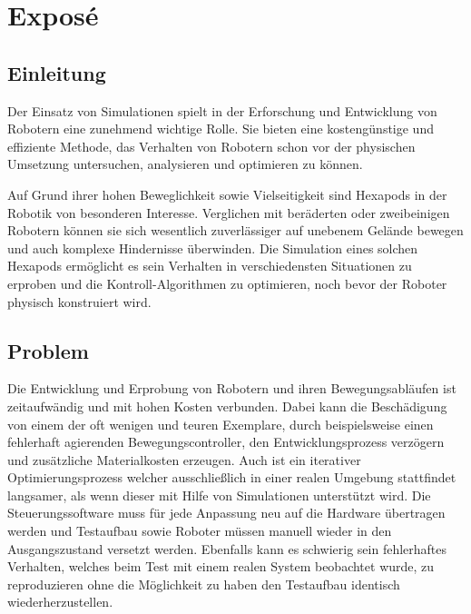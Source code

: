 \chapter{Exposé}
\label{ch:expose}



\section{Einleitung}
Der Einsatz von Simulationen spielt in der Erforschung und Entwicklung von Robotern eine zunehmend wichtige Rolle. 
Sie bieten eine kostengünstige und effiziente Methode, das Verhalten von Robotern schon vor der physischen Umsetzung untersuchen, analysieren und optimieren zu können. 

Auf Grund ihrer hohen Beweglichkeit sowie Vielseitigkeit sind Hexapods in der Robotik von besonderen Interesse. 
Verglichen mit beräderten oder zweibeinigen Robotern können sie sich wesentlich zuverlässiger auf unebenem Gelände bewegen und auch komplexe Hindernisse überwinden.
Die Simulation eines solchen Hexapods ermöglicht es sein Verhalten in verschiedensten Situationen zu erproben und die Kontroll-Algorithmen zu optimieren, noch bevor der Roboter physisch konstruiert wird.

\section{Problem}

Die Entwicklung und Erprobung von Robotern und ihren Bewegungsabläufen ist zeitaufwändig und mit hohen Kosten verbunden.
Dabei kann die Beschädigung von einem der oft wenigen und teuren Exemplare, durch beispielsweise einen fehlerhaft agierenden Bewegungscontroller, den Entwicklungsprozess verzögern und zusätzliche Materialkosten erzeugen.
Auch ist ein iterativer Optimierungsprozess welcher ausschließlich in einer realen Umgebung stattfindet langsamer, als wenn dieser mit Hilfe von Simulationen unterstützt wird.
Die Steuerungssoftware muss für jede Anpassung neu auf die Hardware übertragen werden und Testaufbau sowie Roboter müssen manuell wieder in den Ausgangszustand versetzt werden.
Ebenfalls kann es schwierig sein fehlerhaftes Verhalten, welches beim Test mit einem realen System beobachtet wurde, zu reproduzieren ohne die Möglichkeit zu haben den Testaufbau identisch wiederherzustellen.


